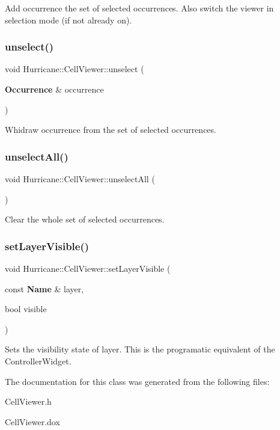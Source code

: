 Add {\ttfamily occurrence} the set of selected occurrences. Also switch the viewer in selection mode (if not already on). \mbox{\label{classHurricane_1_1CellViewer_a48deb92c4f58f987136d116b34f6ccbe}} 
\subsubsection{\texorpdfstring{unselect()}{unselect()}}
{\footnotesize\ttfamily void Hurricane\+::\+Cell\+Viewer\+::unselect (\begin{DoxyParamCaption}\item[{\textbf{ Occurrence} \&}]{occurrence }\end{DoxyParamCaption})}

Whidraw {\ttfamily occurrence} from the set of selected occurrences. \mbox{\label{classHurricane_1_1CellViewer_adae07707d5d4d7a6fca0ad3c44fb95d2}} 
\subsubsection{\texorpdfstring{unselect\+All()}{unselectAll()}}
{\footnotesize\ttfamily void Hurricane\+::\+Cell\+Viewer\+::unselect\+All (\begin{DoxyParamCaption}{ }\end{DoxyParamCaption})}

Clear the whole set of selected occurrences. \mbox{\label{classHurricane_1_1CellViewer_ae628cca8f2c70ff80bba3a0b62e3db14}} 
\subsubsection{\texorpdfstring{set\+Layer\+Visible()}{setLayerVisible()}}
{\footnotesize\ttfamily void Hurricane\+::\+Cell\+Viewer\+::set\+Layer\+Visible (\begin{DoxyParamCaption}\item[{const \textbf{ Name} \&}]{layer,  }\item[{bool}]{visible }\end{DoxyParamCaption})\hspace{0.3cm}{\ttfamily [inline]}}

Sets the visibility state of {\ttfamily layer}. This is the programatic equivalent of the Controller\+Widget. 

The documentation for this class was generated from the following files\+:\begin{DoxyCompactItemize}
\item 
Cell\+Viewer.\+h\item 
Cell\+Viewer.\+dox\end{DoxyCompactItemize}
